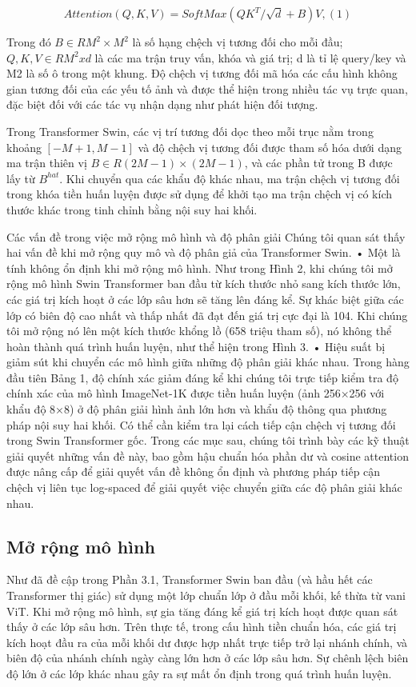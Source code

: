 \documentclass[times, twoside]{zHenriquesLab-StyleBioRxiv}
\begin{document}
$$Attention(Q, K, V) = SoftMax(QK^{T} /\sqrt{d} + B)V, (1)$$

Trong đó $B ∈ RM^{2} \times M^{2}$ là số hạng chệch vị tương đối cho mỗi đầu; $Q, K, V ∈ RM^{2} x d$ là các ma trận truy vấn, khóa và giá trị; d là tỉ lệ query/key và M2 là số ô trong một khung. Độ chệch vị tương đối mã hóa các cấu hình không gian tương đối của các yếu tố ảnh và được thể hiện trong nhiều tác vụ trực quan, đặc biệt đối với các tác vụ nhận dạng như phát hiện đối tượng.

Trong Transformer Swin, các vị trí tương đối dọc theo mỗi trục nằm trong khoảng $[−M + 1, M - 1]$ và độ chệch vị tương đối được tham số hóa dưới dạng ma trận thiên vị $B ∈ R (2M − 1) × (2M − 1)$, và các phần tử trong B được lấy từ $B^{hat}$. Khi chuyển qua các khẩu độ khác nhau, ma trận chệch vị tương đối trong khóa tiền huấn luyện được sử dụng để khởi tạo ma trận chệch vị có kích thước khác trong tinh chỉnh bằng nội suy hai khối.

Các vấn đề trong việc mở rộng mô hình và độ phân giải Chúng tôi quan sát thấy hai vấn đề khi mở rộng quy mô và độ phân giả của Transformer Swin.
• Một là tính không ổn định khi mở rộng mô hình. Như trong Hình 2, khi chúng tôi mở rộng mô hình Swin Transformer ban đầu từ kích thước nhỏ sang kích thước lớn, các giá trị kích hoạt ở các lớp sâu hơn sẽ tăng lên đáng kể. Sự khác biệt giữa các lớp có biên độ cao nhất và thấp nhất đã đạt đến giá trị cực đại là 104. Khi chúng tôi mở rộng nó lên một kích thước khổng lồ (658 triệu tham số), nó không thể hoàn thành quá trình huấn luyện, như thể hiện trong Hình 3.
• Hiệu suất bị giảm sút khi chuyển các mô hình giữa những độ phân giải khác nhau. Trong hàng đầu tiên Bảng 1, độ chính xác giảm đáng kể khi chúng tôi trực tiếp kiểm tra độ chính xác của mô hình ImageNet-1K được tiền huấn luyện (ảnh 256×256 với khẩu độ 8×8) ở độ phân giải hình ảnh lớn hơn và khẩu độ thông qua phương pháp nội suy hai khối. Có thể cần kiểm tra lại cách tiếp cận chệch vị tương đối trong Swin Transformer gốc.
Trong các mục sau, chúng tôi trình bày các kỹ thuật giải quyết những vấn đề này, bao gồm hậu chuẩn hóa phần dư và cosine attention được nâng cấp để giải quyết vấn đề không ổn định và phương pháp tiếp cận chệch vị liên tục log-spaced để giải quyết việc chuyển giữa các độ phân giải khác nhau.

\subsection*{Mở rộng mô hình}
Như đã đề cập trong Phần 3.1, Transformer Swin ban đầu (và hầu hết các Transformer thị giác) sử dụng một lớp chuẩn lớp ở đầu mỗi khối, kế thừa từ vani ViT. Khi mở rộng mô hình, sự gia tăng đáng kể giá trị kích hoạt được quan sát thấy ở các lớp sâu hơn. Trên thực tế, trong cấu hình tiền chuẩn hóa, các giá trị kích hoạt đầu ra của mỗi khối dư được hợp nhất trực tiếp trở lại nhánh chính, và biên độ của nhánh chính ngày càng lớn hơn ở các lớp sâu hơn. Sự chênh lệch biên độ lớn ở các lớp khác nhau gây ra sự mất ổn định trong quá trình huấn luyện.
\end{document}
